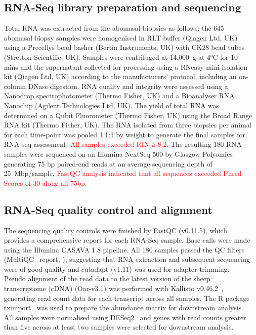 \documentclass[a4paper, hidelinks, 11pt]{article}
\begin{document}
\subsection{RNA-Seq library preparation and sequencing}

Total RNA was extracted from the abomasal biopsies as follows: the 645
abomasal biopsy samples were homogenised in RLT buffer (Qiagen Ltd, UK) using
a Precellys bead basher (Bertin Instruments, UK) with CK28 bead tubes
(Stretton Scientific, UK). Samples were centrifuged at 14,000~g at 4°C for 10
mins and the supernatant collected for processing using a RNeasy
mini-isolation kit (Qiagen Ltd, UK) according to the manufacturers’ protocol,
including an on-column DNase digestion. RNA quality and integrity were
assessed using a Nanodrop spectrophotometer (Thermo Fisher, UK) and a
Bioanalyser RNA Nanochip (Agilent Technologies Ltd, UK). The yield of total
RNA was determined on a Qubit Fluorometer (Thermo Fisher, UK) using the Broad
Range RNA kit (Thermo Fisher, UK). The RNA isolated from three biopsies per
animal for each time-point was pooled 1:1:1 by weight to generate the final
samples for RNA-seq assessment. \textcolor{red}{All samples exceeded RIN ≥ 8.2.} The resulting 180 RNA samples were sequenced
on an Illumina NextSeq 500 by Glasgow Polyomics~\supercite{PolyomicsURL}
generating 75 bp paired-end reads at an average sequencing depth of
25~Mbp/sample. \textcolor{red}{FastQC analysis indicated that all sequences exceeded Phred Scores of 30 along all 75bp.}

\subsection{RNA-Seq quality control and alignment}

The sequencing quality controls were finished by FastQC (v0.11.5), which
provides a comprehensive report for each RNA-Seq sample. Base calls were made
using the Illumina CASAVA 1.8 pipeline. All 180 samples passed the QC filters
(MultiQC~\supercite{Ewels2016} report, ), suggesting that
RNA extraction and subsequent sequencing were of good quality and cutadapt
(v1.11) was used for adapter trimming. Pseudo alignment of the read data to
the latest version of the sheep transcriptome (cDNA) (Oar-v3.1) was performed
with Kallisto v0.46.2~\supercite{Bray2016}, generating read count data for each
transcript across all samples. The R package tximport~\supercite{Soneson2015} was
used to prepare the abundance matrix for downstream analysis. All samples
were normalised using DESeq2~\supercite{Love2014} and genes with read counts
greater than five across at least two samples were selected for downstream
analysis.
\end{document}
